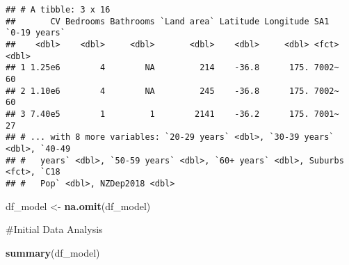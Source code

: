 \documentclass[
]{article}
\newenvironment{Shaded}{\begin{snugshade}}{\end{snugshade}}
\newcommand{\KeywordTok}[1]{\textcolor[rgb]{0.13,0.29,0.53}{\textbf{#1}}}
\newcommand{\NormalTok}[1]{#1}
\newcommand{\StringTok}[1]{\textcolor[rgb]{0.31,0.60,0.02}{#1}}
\begin{document}
\begin{verbatim}
## # A tibble: 3 x 16
##       CV Bedrooms Bathrooms `Land area` Latitude Longitude SA1   `0-19 years`
##    <dbl>    <dbl>     <dbl>       <dbl>    <dbl>     <dbl> <fct>        <dbl>
## 1 1.25e6        4        NA         214    -36.8      175. 7002~           60
## 2 1.10e6        4        NA         245    -36.8      175. 7002~           60
## 3 7.40e5        1         1        2141    -36.2      175. 7001~           27
## # ... with 8 more variables: `20-29 years` <dbl>, `30-39 years` <dbl>, `40-49
## #   years` <dbl>, `50-59 years` <dbl>, `60+ years` <dbl>, Suburbs <fct>, `C18
## #   Pop` <dbl>, NZDep2018 <dbl>
\end{verbatim}

\begin{Shaded}
\begin{Highlighting}[]
\NormalTok{df_model <-}\StringTok{ }\KeywordTok{na.omit}\NormalTok{(df_model)}
\end{Highlighting}
\end{Shaded}

\#Initial Data Analysis

\begin{Shaded}
\begin{Highlighting}[]
\KeywordTok{summary}\NormalTok{(df_model)}
\end{Highlighting}
\end{Shaded}
\end{document}
